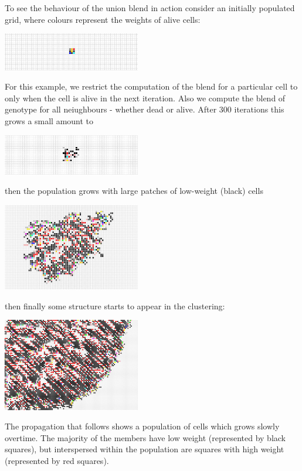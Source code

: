 \documentclass{AISB2008}
\begin{document}
To see the behaviour
of the union blend in action consider an initially populated grid, where
colours represent the weights of alive cells:
 \begin{center}
 \includegraphics[width=0.45\textwidth]{initial2d.jpg}
 \end{center}
For this example, we restrict the computation of the blend for a particular cell to only when the cell is alive in the next iteration. Also we compute the blend of genotype for all neiughbours - whether dead or alive. After 300 iterations this grows a small amount to
 \begin{center}
 \includegraphics[width=0.45\textwidth]{3002d.jpg}
 \end{center}
then the population grows with large patches of low-weight (black) cells
 \begin{center}
 \includegraphics[width=0.45\textwidth]{30002d.jpg}
 \end{center}
then finally some structure starts to appear in the clustering:
 \begin{center}
 \includegraphics[width=0.45\textwidth]{300002d.jpg}
 \end{center}
The propagation that follows shows a population of cells which grows
slowly overtime. The majority of the members have low weight
(represented by black squares), but interspersed within the population
are squares with high weight (represented by red squares). 
\end{document}
